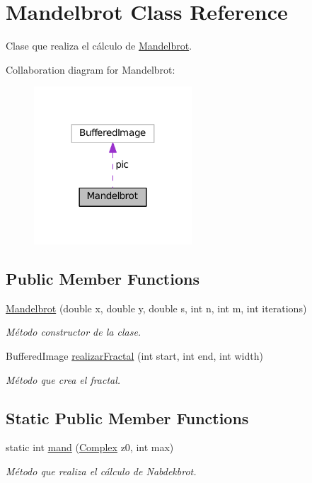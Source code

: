 \hypertarget{class_mandelbrot}{}\section{Mandelbrot Class Reference}
\label{class_mandelbrot}


Clase que realiza el cálculo de \hyperlink{class_mandelbrot}{Mandelbrot}.  




Collaboration diagram for Mandelbrot\+:
\nopagebreak
\begin{figure}[H]
\begin{center}
\leavevmode
\includegraphics[width=167pt]{class_mandelbrot__coll__graph}
\end{center}
\end{figure}
\subsection*{Public Member Functions}
\begin{DoxyCompactItemize}
\item 
\hyperlink{class_mandelbrot_a09830bd77bc96c054e4e453e8326fda1}{Mandelbrot} (double x, double y, double s, int n, int m, int iterations)
\begin{DoxyCompactList}\small\item\em Método constructor de la clase. \end{DoxyCompactList}\item 
Buffered\+Image \hyperlink{class_mandelbrot_a51a2075937f0553564a5040f44070500}{realizar\+Fractal} (int start, int end, int width)
\begin{DoxyCompactList}\small\item\em Método que crea el fractal. \end{DoxyCompactList}\end{DoxyCompactItemize}
\subsection*{Static Public Member Functions}
\begin{DoxyCompactItemize}
\item 
static int \hyperlink{class_mandelbrot_a5f0b4399e850a94193d87e03cca38736}{mand} (\hyperlink{class_complex}{Complex} z0, int max)
\begin{DoxyCompactList}\small\item\em Método que realiza el cálculo de Nabdekbrot. \end{DoxyCompactList}\end{DoxyCompactItemize}


